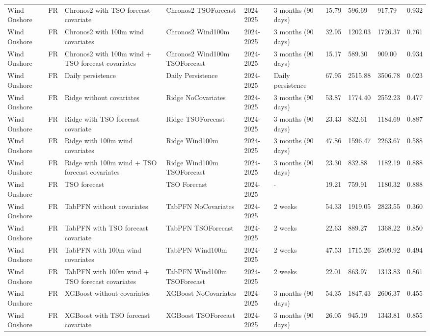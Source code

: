 \begin{longtable}{llllllllll}
Wind Onshore & FR & Chronos2 with TSO forecast covariate & Chronos2 TSOForecast & 2024-2025 & 3 months (90 days) & 15.79 & 596.69 & 917.79 & 0.932 \\
Wind Onshore & FR & Chronos2 with 100m wind covariates & Chronos2 Wind100m & 2024-2025 & 3 months (90 days) & 32.95 & 1202.03 & 1726.37 & 0.761 \\
Wind Onshore & FR & Chronos2 with 100m wind + TSO forecast covariates & Chronos2 Wind100m TSOForecast & 2024-2025 & 3 months (90 days) & 15.17 & 589.30 & 909.00 & 0.934 \\
Wind Onshore & FR & Daily persistence & Daily Persistence & 2024-2025 & Daily persistence & 67.95 & 2515.88 & 3506.78 & 0.023 \\
Wind Onshore & FR & Ridge without covariates & Ridge NoCovariates & 2024-2025 & 3 months (90 days) & 53.87 & 1774.40 & 2552.23 & 0.477 \\
Wind Onshore & FR & Ridge with TSO forecast covariate & Ridge TSOForecast & 2024-2025 & 3 months (90 days) & 23.43 & 832.61 & 1184.69 & 0.887 \\
Wind Onshore & FR & Ridge with 100m wind covariates & Ridge Wind100m & 2024-2025 & 3 months (90 days) & 47.86 & 1596.47 & 2263.67 & 0.588 \\
Wind Onshore & FR & Ridge with 100m wind + TSO forecast covariates & Ridge Wind100m TSOForecast & 2024-2025 & 3 months (90 days) & 23.30 & 832.88 & 1182.19 & 0.888 \\
Wind Onshore & FR & TSO forecast & TSO Forecast & 2024-2025 & - & 19.21 & 759.91 & 1180.32 & 0.888 \\
Wind Onshore & FR & TabPFN without covariates & TabPFN NoCovariates & 2024-2025 & 2 weeks & 54.33 & 1919.05 & 2823.55 & 0.360 \\
Wind Onshore & FR & TabPFN with TSO forecast covariate & TabPFN TSOForecast & 2024-2025 & 2 weeks & 22.63 & 889.27 & 1368.22 & 0.850 \\
Wind Onshore & FR & TabPFN with 100m wind covariates & TabPFN Wind100m & 2024-2025 & 2 weeks & 47.53 & 1715.26 & 2509.92 & 0.494 \\
Wind Onshore & FR & TabPFN with 100m wind + TSO forecast covariates & TabPFN Wind100m TSOForecast & 2024-2025 & 2 weeks & 22.01 & 863.97 & 1313.83 & 0.861 \\
Wind Onshore & FR & XGBoost without covariates & XGBoost NoCovariates & 2024-2025 & 3 months (90 days) & 54.35 & 1847.43 & 2606.37 & 0.455 \\
Wind Onshore & FR & XGBoost with TSO forecast covariate & XGBoost TSOForecast & 2024-2025 & 3 months (90 days) & 26.05 & 945.19 & 1343.81 & 0.855 \\

\end{longtable}
